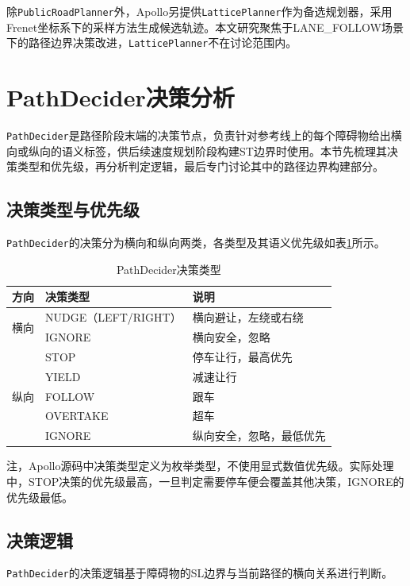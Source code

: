 除\texttt{PublicRoadPlanner}外，Apollo另提供\texttt{LatticePlanner}\cite{werling2010}作为备选规划器，采用Frenet坐标系下的采样方法生成候选轨迹。本文研究聚焦于LANE\_FOLLOW场景下的路径边界决策改进，\texttt{LatticePlanner}不在讨论范围内。

\section{PathDecider决策分析}
\label{sec:path_decider}

\texttt{PathDecider}是路径阶段末端的决策节点，负责针对参考线上的每个障碍物给出横向或纵向的语义标签，供后续速度规划阶段构建ST边界时使用。本节先梳理其决策类型和优先级，再分析判定逻辑，最后专门讨论其中的路径边界构建部分。

\subsection{决策类型与优先级}

\texttt{PathDecider}的决策分为横向和纵向两类，各类型及其语义优先级如表\ref{tab:path_decisions}所示。

\begin{table}[htbp]
\centering
\caption{PathDecider决策类型}
\label{tab:path_decisions}
\begin{tabular}{lll}
\toprule
方向 & \textbf{决策类型} & \textbf{说明} \\
\midrule
\multirow{2}{*}{横向} & NUDGE（LEFT/RIGHT） & 横向避让，左绕或右绕 \\
& IGNORE & 横向安全，忽略 \\
\midrule
\multirow{5}{*}{纵向} & STOP & 停车让行，最高优先 \\
& YIELD & 减速让行 \\
& FOLLOW & 跟车 \\
& OVERTAKE & 超车 \\
& IGNORE & 纵向安全，忽略，最低优先 \\
\bottomrule
\end{tabular}
\end{table}

注，Apollo源码中决策类型定义为枚举类型，不使用显式数值优先级。实际处理中，STOP决策的优先级最高，一旦判定需要停车便会覆盖其他决策，IGNORE的优先级最低。

\subsection{决策逻辑}

\texttt{PathDecider}的决策逻辑基于障碍物的SL边界与当前路径的横向关系进行判断。

